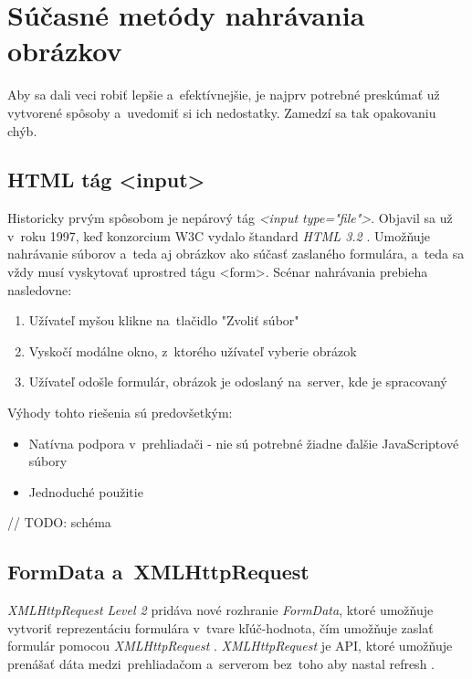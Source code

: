 \chapter{Súčasné metódy nahrávania obrázkov}

Aby sa dali veci robiť lepšie a~efektívnejšie, je najprv potrebné preskúmať už vytvorené spôsoby a~uvedomiť si ich nedostatky. Zamedzí sa tak opakovaniu chýb.
  

\section{HTML tág <input\textgreater}

Historicky prvým spôsobom je nepárový tág \emph{<input type="file"\textgreater}. Objavil sa už v~roku 1997, keď konzorcium W3C vydalo štandard \emph{HTML 3.2} \cite{html32}. Umožňuje nahrávanie súborov a~teda aj obrázkov ako súčasť zaslaného formulára, a~teda sa vždy musí vyskytovať uprostred tágu <form\textgreater. Scénar nahrávania prebieha nasledovne:
\begin{enumerate}
	\item Užívateľ myšou klikne na~tlačidlo "Zvoliť súbor"
	\item Vyskočí modálne okno, z~ktorého užívateľ vyberie obrázok
	\item Užívateľ odošle formulár, obrázok je odoslaný na~server, kde je spracovaný
\end{enumerate}

Výhody tohto riešenia sú predovšetkým:
\begin{itemize}
	\item Natívna podpora v~prehliadači - nie sú potrebné žiadne ďalšie JavaScriptové súbory
	\item Jednoduché použitie
\end{itemize}

// TODO: schéma


\section{FormData a~XMLHttpRequest}

\emph{XMLHttpRequest Level 2} pridáva nové rozhranie \emph{FormData}, ktoré umožňuje vytvoriť reprezentáciu formulára v~tvare kľúč-hodnota, čím umožňuje zaslať formulár pomocou \emph{XMLHttpRequest} \cite{MDN_Formdata}. \emph{XMLHttpRequest} je API, ktoré umožňuje prenášať dáta medzi~prehliadačom a~serverom bez~toho aby nastal refresh \cite{MDN_XMLHttpRequest}.

